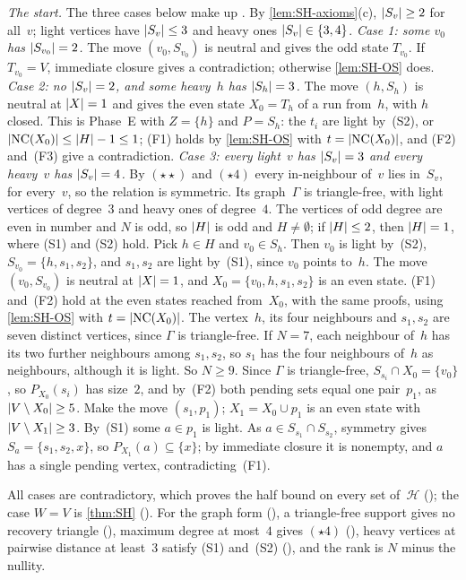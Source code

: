 \begin{outline}
\emph{The start.} The three cases below make up . By \cref{lem:SH-axioms}(c), $\lvert S_v \rvert\ge2$ for
all~$v$; light vertices have $\lvert S_v \rvert\le3$ and heavy ones $\lvert S_v \rvert\in\{3,4\}$.
\emph{Case 1: some $v_0$ has $\lvert S_{v_0} \rvert=2$.} The move $(v_0,S_{v_0})$ is neutral and gives the odd state $T_{v_0}$. If
$T_{v_0}=V$, immediate closure gives a contradiction; otherwise \cref{lem:SH-OS} does.
\emph{Case 2: no $\lvert S_v \rvert=2$, and some heavy~$h$ has $\lvert S_h \rvert=3$.} The move $(h,S_h)$ is neutral at $\lvert X \rvert=1$ and gives
the even state $X_0=T_h$ of a run from~$h$, with $h$ closed. This is Phase~E with $Z=\{h\}$ and $P=S_h$: the $t_i$ are light
by~(S2), or $\lvert \mathrm{NC}(X_0) \rvert\le\lvert H \rvert-1\le1$; (F1) holds by \cref{lem:SH-OS} with $t=\lvert \mathrm{NC}(X_0) \rvert$, and
(F2) and~(F3) give a contradiction.
\emph{Case 3: every light~$v$ has $\lvert S_v \rvert=3$ and every heavy~$v$ has $\lvert S_v \rvert=4$.} By $(\star\star)$ and $(\star4)$ every
in-neighbour of~$v$ lies in~$S_v$, for every~$v$, so the relation is symmetric. Its graph~$\Gamma$ is triangle-free, with light
vertices of degree~$3$ and heavy ones of degree~$4$. The vertices of odd degree are even in number and $N$ is odd, so $\lvert H \rvert$
is odd and $H\ne\emptyset$; if $\lvert H \rvert\le2$, then $\lvert H \rvert=1$, where (S1) and (S2) hold. Pick $h\in H$ and $v_0\in S_h$. Then
$v_0$ is light by~(S2), $S_{v_0}=\{h,s_1,s_2\}$, and $s_1,s_2$ are light by~(S1), since $v_0$ points to~$h$. The move
$(v_0,S_{v_0})$ is neutral at $\lvert X \rvert=1$, and $X_0=\{v_0,h,s_1,s_2\}$ is an even state. (F1) and~(F2) hold at the even states
reached from~$X_0$, with the same proofs, using \cref{lem:SH-OS} with $t=\lvert \mathrm{NC}(X_0) \rvert$. The vertex~$h$, its four neighbours
and $s_1,s_2$ are seven distinct vertices, since $\Gamma$ is triangle-free. If $N=7$, each neighbour of~$h$ has its two further
neighbours among $s_1,s_2$, so $s_1$ has the four neighbours of~$h$ as neighbours, although it is light. So $N\ge9$. Since
$\Gamma$ is triangle-free, $S_{s_i}\cap X_0=\{v_0\}$, so $P_{X_0}(s_i)$ has size~$2$, and by~(F2) both pending sets equal one
pair~$p_1$, as $\lvert V\setminus X_0 \rvert\ge5$. Make the move $(s_1,p_1)$; $X_1=X_0\cup p_1$ is an even state with
$\lvert V\setminus X_1 \rvert\ge3$. By~(S1) some $a\in p_1$ is light. As $a\in S_{s_1}\cap S_{s_2}$, symmetry gives $S_a=\{s_1,s_2,x\}$,
so $P_{X_1}(a)\subseteq\{x\}$; by immediate closure it is nonempty, and $a$ has a single pending vertex, contradicting~(F1).

All cases are contradictory, which proves the half bound on every set of~$\mathcal H$ (); the
case $W=V$ is \cref{thm:SH} (). For the graph form (), a triangle-free support gives no
recovery triangle (), maximum degree at most~$4$ gives $(\star4)$
(), heavy vertices at pairwise distance at least~$3$ satisfy (S1) and~(S2)
(), and the rank is $N$ minus the nullity.
\end{outline}

